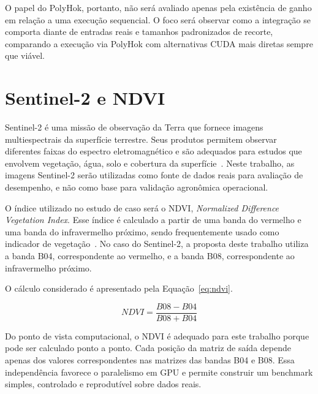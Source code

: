 \documentclass[tcc,capa]{texufpel}
\begin{document}
O papel do PolyHok, portanto, não será avaliado apenas pela existência de ganho em
relação a uma execução sequencial. O foco será observar como a integração se
comporta diante de entradas reais e tamanhos padronizados de recorte, comparando a
execução via PolyHok com alternativas CUDA mais diretas sempre que viável.

\section{Sentinel-2 e NDVI}

Sentinel-2 é uma missão de observação da Terra que fornece imagens
multiespectrais da superfície terrestre. Seus produtos permitem observar diferentes
faixas do espectro eletromagnético e são adequados para estudos que envolvem
vegetação, água, solo e cobertura da superfície~\cite{copernicusSentinel2Docs2026}.
Neste trabalho, as imagens Sentinel-2 serão utilizadas como fonte de dados reais
para avaliação de desempenho, e não como base para validação agronômica
operacional.

O índice utilizado no estudo de caso será o NDVI, \textit{Normalized Difference
Vegetation Index}. Esse índice é calculado a partir de uma banda do vermelho e uma
banda do infravermelho próximo, sendo frequentemente usado como indicador de
vegetação~\cite{usgsNdvi2026}. No caso do Sentinel-2, a proposta deste trabalho
utiliza a banda B04, correspondente ao vermelho, e a banda B08, correspondente ao
infravermelho próximo.

O cálculo considerado é apresentado pela Equação~\ref{eq:ndvi}.

\begin{equation}
NDVI = \frac{B08 - B04}{B08 + B04}
\label{eq:ndvi}
\end{equation}

Do ponto de vista computacional, o NDVI é adequado para este trabalho porque pode
ser calculado ponto a ponto. Cada posição da matriz de saída depende apenas dos
valores correspondentes nas matrizes das bandas B04 e B08. Essa independência
favorece o paralelismo em GPU e permite construir um benchmark simples, controlado
e reprodutível sobre dados reais.
\end{document}
